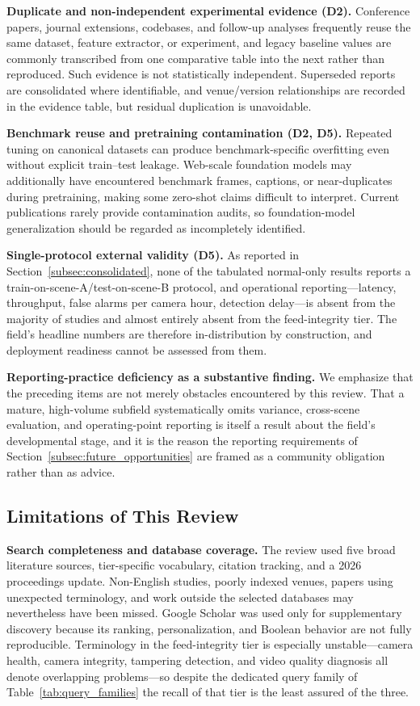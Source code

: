 \documentclass[10pt,a4paper]{article}
\begin{document}
\textbf{Duplicate and non-independent experimental evidence (D2).} Conference papers, journal extensions, codebases, and follow-up analyses frequently reuse the same dataset, feature extractor, or experiment, and legacy baseline values are commonly transcribed from one comparative table into the next rather than reproduced. Such evidence is not statistically independent. Superseded reports are consolidated where identifiable, and venue/version relationships are recorded in the evidence table, but residual duplication is unavoidable.

\textbf{Benchmark reuse and pretraining contamination (D2, D5).} Repeated tuning on canonical datasets can produce benchmark-specific overfitting even without explicit train--test leakage. Web-scale foundation models may additionally have encountered benchmark frames, captions, or near-duplicates during pretraining, making some zero-shot claims difficult to interpret. Current publications rarely provide contamination audits, so foundation-model generalization should be regarded as incompletely identified.

\textbf{Single-protocol external validity (D5).} As reported in Section~\ref{subsec:consolidated}, none of the tabulated normal-only results reports a train-on-scene-A/test-on-scene-B protocol, and operational reporting---latency, throughput, false alarms per camera hour, detection delay---is absent from the majority of studies and almost entirely absent from the feed-integrity tier. The field's headline numbers are therefore in-distribution by construction, and deployment readiness cannot be assessed from them.

\textbf{Reporting-practice deficiency as a substantive finding.} We emphasize that the preceding items are not merely obstacles encountered by this review. That a mature, high-volume subfield systematically omits variance, cross-scene evaluation, and operating-point reporting is itself a result about the field's developmental stage, and it is the reason the reporting requirements of Section~\ref{subsec:future_opportunities} are framed as a community obligation rather than as advice.

\subsection{Limitations of This Review}
\label{subsec:threats_review}

\textbf{Search completeness and database coverage.} The review used five broad literature sources, tier-specific vocabulary, citation tracking, and a 2026 proceedings update. Non-English studies, poorly indexed venues, papers using unexpected terminology, and work outside the selected databases may nevertheless have been missed. Google Scholar was used only for supplementary discovery because its ranking, personalization, and Boolean behavior are not fully reproducible. Terminology in the feed-integrity tier is especially unstable---camera health, camera integrity, tampering detection, and video quality diagnosis all denote overlapping problems---so despite the dedicated query family of Table~\ref{tab:query_families} the recall of that tier is the least assured of the three.
\end{document}
